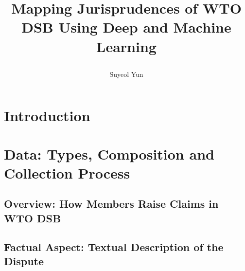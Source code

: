 \documentclass[12pt,letterpaper]{article}
\newcommand{\tit}{
\bf 
Mapping Jurisprudences of WTO DSB Using Deep and Machine Learning
}
\newcommand\spacingset[1]{\renewcommand{\baselinestretch}
{#1}\small\normalsize}
\begin{document}
\spacingset{1.25}

\setcounter{page}{0}
\vspace{-.1in}

{\title{
    \tit
  }
  \author{Suyeol Yun
  }
  \maketitle
}

\thispagestyle{empty}
\vspace{-.1in}

\begin{abstract}
  
\end{abstract}

\spacingset{1.5} %

% 

\section{Introduction}










\section{Data: Types, Composition and Collection Process} \label{sec:data}


\subsection{Overview: How Members Raise Claims in WTO DSB}


\subsection{Factual Aspect: Textual Description of the Dispute}

\end{document}
